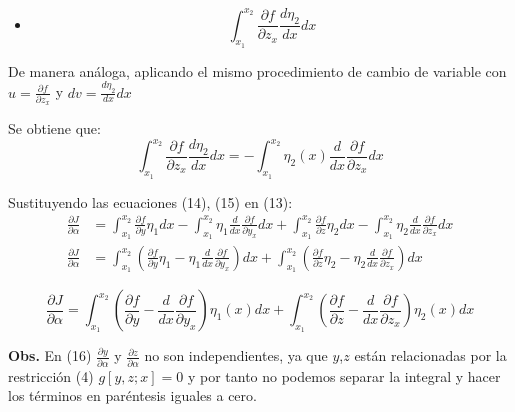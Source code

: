 \begin{itemize}
    \item $$\int_{x_{1}}^{x_{2}} \frac{\partial f}{\partial z_{x}}  \frac{d \eta_{2}}{dx} dx$$
\end{itemize}

De manera análoga, aplicando el mismo procedimiento de cambio de variable con
$u=\frac{\partial f}{\partial z_{x}}$ y $dv=\frac{d \eta_{2}}{dx} dx$

\vspace*{0.5cm}
Se obtiene que:
\begin{equation}
    \int_{x_{1}}^{x_{2}} \frac{\partial f}{\partial z_{x}}  \frac{d \eta_{2}}{dx} dx =
    -\int_{x_{1}}^{x_{2}} \eta_{2} (x) \frac{d}{dx} \frac{\partial f}{\partial z_{x}} dx
\end{equation}

\vspace*{0.5cm}
Sustituyendo las ecuaciones (14), (15) en (13):
\begin{align*}
    \frac{\partial J}{\partial \alpha} &=
    \int_{x_{1}}^{x_{2}} \frac{\partial f}{\partial y} \eta_{1}   dx
    -\int_{x_{1}}^{x_{2}} \eta_{1} \frac{d}{dx} \frac{\partial f}{\partial y_{x}} dx
    +\int_{x_{1}}^{x_{2}} \frac{\partial f}{\partial z} \eta_{2}  dx
    -\int_{x_{1}}^{x_{2}} \eta_{2} \frac{d}{dx} \frac{\partial f}{\partial z_{x}} dx \\
    \frac{\partial J}{\partial \alpha} &=
    \int_{x_{1}}^{x_{2}} \left( \frac{\partial f}{\partial y} \eta_{1} - \eta_{1} \frac{d}{dx} \frac{\partial f}{\partial y_{x}} \right) dx
    + \int_{x_{1}}^{x_{2}} \left( \frac{\partial f}{\partial z} \eta_{2} - \eta_{2} \frac{d}{dx} \frac{\partial f}{\partial z_{x}} \right) dx
\end{align*}

\begin{equation}
    \frac{\partial J}{\partial \alpha} =
    \int_{x_{1}}^{x_{2}} \left( \frac{\partial f}{\partial y} - \frac{d}{dx} \frac{\partial f}{\partial y_{x}} \right) \eta_{1}(x) dx
    + \int_{x_{1}}^{x_{2}} \left( \frac{\partial f}{\partial z} - \frac{d}{dx} \frac{\partial f}{\partial z_{x}} \right) \eta_{2}(x) dx
\end{equation}

\vspace*{0.5cm}
\textbf{Obs.} En (16) $\frac{\partial y}{\partial \alpha}$ y $\frac{\partial z}{\partial \alpha}$ no son independientes,
ya que $y$,$z$ están relacionadas por la restricción (4) $g\left[ y,z;x \right] = 0$ y por tanto no podemos separar la
integral y hacer los términos en paréntesis iguales a cero.

